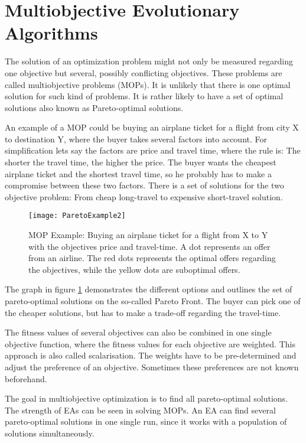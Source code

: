     \section{Multiobjective Evolutionary Algorithms}
    The solution of an optimization problem might not only be measured regarding one objective but several, possibly conflicting objectives. These problems are called multiobjective problems (MOPs). It is unlikely that there is one optimal solution for such kind of problems. It is rather likely to have a set of optimal solutions also known as Pareto-optimal solutions.
    
    An example of a MOP could be buying an airplane ticket for a flight from city X to destination Y, where the buyer takes several factors into account. For simplification lets say the factors are price and travel time, where the rule is: The shorter the travel time, the higher the price. The buyer wants the cheapest airplane ticket and the shortest travel time, so he probably has to make a compromise between these two factors. There is a set of solutions for the two objective problem: From cheap long-travel to expensive short-travel solution.
    
    \begin{figure}
        \centering
        \texttt{[image: ParetoExample2]}
        \caption{MOP Example: Buying an airplane ticket for a flight from X to Y with the objectives price and travel-time. A dot represents an offer from an airline. The red dots represents the optimal offers regarding the objectives, while the yellow dots are suboptimal offers.}
        \label{fig:paretoExample}
    \end{figure}
    
    The graph in figure \ref{fig:paretoExample} demonstrates the different options and outlines the set of pareto-optimal solutions on the so-called Pareto Front. The buyer can pick one of the cheaper solutions, but has to make a trade-off regarding the travel-time.
    
    The fitness values of several objectives can also be combined in one single objective function, where the fitness values for each objective are weighted. This approach is also called scalarisation\cite{Eiben}. The weights have to be pre-determined and adjust the preference of an objective. Sometimes these preferences are not known beforehand.
    
    The goal in multiobjective optimization is to find all pareto-optimal solutions. The strength of EAs can be seen in solving MOPs. An EA can find several pareto-optimal solutions in one single run, since it works with a population of solutions simultaneously\cite{Deb:2002}.
    
